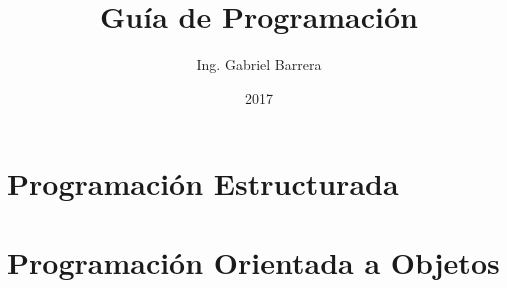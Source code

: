 \documentclass[a4paper,11pt,spanish,twoside]{book}
\title{Guía de Programación}
\author{Ing. Gabriel Barrera}
\date{2017}
\begin{document}
   \maketitle

   \frontmatter

   \tableofcontents

   

   \mainmatter

   \part{Programación Estructurada}

   

   

   

   

   

   

   

   

   \part{Programación Orientada a Objetos}
\end{document}
